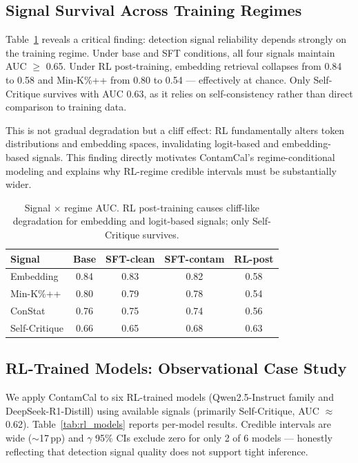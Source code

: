 \documentclass[letterpaper,11pt]{article}
\begin{document}
\subsection{Signal Survival Across Training Regimes}
\label{sec:signal_survival}

Table~\ref{tab:signal_regime} reveals a critical finding: detection signal reliability depends strongly on the training regime. Under base and SFT conditions, all four signals maintain AUC $\geq$ 0.65. Under RL post-training, embedding retrieval collapses from 0.84 to 0.58 and Min-K\%++ from 0.80 to 0.54 --- effectively at chance. Only Self-Critique survives with AUC 0.63, as it relies on self-consistency rather than direct comparison to training data.

This is not gradual degradation but a cliff effect: RL fundamentally alters token distributions and embedding spaces, invalidating logit-based and embedding-based signals. This finding directly motivates ContamCal's regime-conditional modeling and explains why RL-regime credible intervals must be substantially wider.

\begin{table}[t]
\centering
\caption{Signal $\times$ regime AUC. RL post-training causes cliff-like degradation for embedding and logit-based signals; only Self-Critique survives.}
\label{tab:signal_regime}
\small
\begin{tabular}{lcccc}
\toprule
Signal & Base & SFT-clean & SFT-contam & RL-post \\
\midrule
Embedding & 0.84 & 0.83 & 0.82 & 0.58 \\
Min-K\%++ & 0.80 & 0.79 & 0.78 & 0.54 \\
ConStat & 0.76 & 0.75 & 0.74 & 0.56 \\
Self-Critique & 0.66 & 0.65 & 0.68 & 0.63 \\
\bottomrule
\end{tabular}
\end{table}

\subsection{RL-Trained Models: Observational Case Study}
\label{sec:rl_case}

We apply ContamCal to six RL-trained models (Qwen2.5-Instruct family and DeepSeek-R1-Distill) using available signals (primarily Self-Critique, AUC $\approx$ 0.62). Table~\ref{tab:rl_models} reports per-model results. Credible intervals are wide ($\sim$17\,pp) and $\gamma$ 95\% CIs exclude zero for only 2 of 6 models --- honestly reflecting that detection signal quality does not support tight inference.
\end{document}
